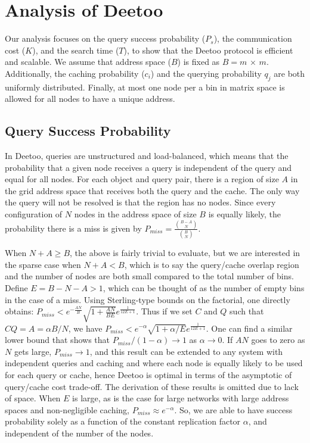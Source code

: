 \documentclass[conference]{IEEEtran}
\begin{document}
\section{Analysis of Deetoo}\label{sec:analysis}
Our analysis focuses on the query success probability ($P_{s}$), 
the communication cost ($K$), and the search time ($T$),
to show that the Deetoo protocol
is efficient and scalable. We assume that
address space ($B$) is fixed as $B=m$ $\times$
$m$. Additionally, the caching probability ($c_i$) 
and the querying probability $q_j$
are both uniformly distributed. 
Finally, at most one node per
a bin in matrix space is allowed for all nodes to have a unique
address.


\subsection{Query Success Probability}
\label{sec:suc_prob}
In Deetoo, queries are unstructured and load-balanced, which means
that the probability that a given node receives a query is independent
of the query and equal for all nodes.
For each object and query pair, there
is a region of size $A$ in the grid address space that receives both the query
and the cache. The only way the query will not be resolved is that the region
has no nodes.  Since every configuration of $N$ nodes in the address
space of size $B$ is equally likely, the probability there is a miss is given
by $P_{miss}=\frac{{{B-A}\choose N }}{{B \choose N}}$.

When $N+A\ge B$, the above is fairly trivial to evaluate, but we are
interested in the sparse case when $N+A<B$, which is to say the query/cache
overlap region and the number of nodes are both small compared to the total
number of bins.  Define $E=B-N-A>1$, which can be thought of as the number of
empty bins in the case of a miss.
Using Sterling-type bounds on the factorial, one directly obtains:
$P_{miss} < e^{-\frac{AN}{B}}\sqrt{1+\frac{AN}{BE}}e^{\frac{1}{12E+1}}$.
Thus if we set $C$ and $Q$ such that
$CQ=A=\alpha B/N$, we have
$P_{miss} < e^{-\alpha}\sqrt{1+\alpha/E}e^{\frac{1}{12E+1}}$.
One can find a similar lower bound that shows that
$P_{miss}/(1-\alpha)\rightarrow 1$ as $\alpha\rightarrow 0$.
If $AN$ goes to zero as $N$ gets large, $P_{miss}\rightarrow 1$,
and this result can be extended to any system with independent queries and
caching and where each node is equally likely to be used for each query or
cache, hence Deetoo is optimal in terms of the asymptotic of query/cache cost
trade-off.
The derivation of these results is omitted due to
lack of space.
When $E$ is large, as is the case for large networks with large address
spaces and non-negligible caching, $P_{miss}\approx e^{-\alpha}$.
So, we are able to have success probability solely as a function of the 
constant replication factor $\alpha$, and 
independent of the number of the nodes.
\end{document}

